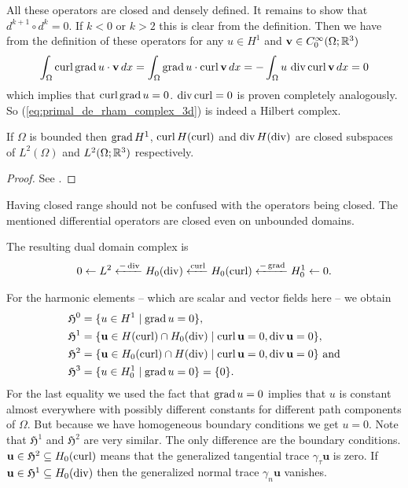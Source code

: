 \documentclass[../master_thesis.tex]{subfiles}
\begin{document}
All these operators are closed and densely defined. It remains to show that 
$d^{k+1} \circ d^k = 0$. If $k < 0$ or $k>2$ this is clear from the definition. 
Then we have from the definition of these operators 
for any $u \in H^1$ and $\mathbf{v} \in C^\infty_0(\Omega;\mathbb{R}^3)$  
\begin{align*}
    \int_\Omega \operatorname{curl} \operatorname{grad} u \cdot \mathbf{v} \, dx 
    = \int_\Omega \operatorname{grad} u \cdot \operatorname{curl} \mathbf{v} \, dx 
    = -\int_\Omega u \, \operatorname{div} \operatorname{curl} \mathbf{v} \, dx
    = 0
\end{align*}
which implies that $\operatorname{curl} \operatorname{grad} u = 0$. $\operatorname{div} \operatorname{curl} = 0$ is proven 
completely analogously. So (\ref{eq:primal_de_rham_complex_3d}) is indeed a 
Hilbert complex. 

\begin{theorem}\label{thm:closed_range}
    If $\Omega$ is bounded then $\operatorname{grad} H^1$, $\operatorname{curl} H(\operatorname{curl})$ and 
    $\operatorname{div} H(\operatorname{div})$ are closed subspaces of $L^2(\Omega)$ and 
    $L^2(\Omega;\mathbb{R}^3)$ respectively.
\end{theorem}
\begin{proof}
    See \cite[p.38]{arnold}.
\end{proof}
Having closed range should not be confused with the operators being closed.
The mentioned differential operators are closed even on unbounded domains.

The resulting dual domain complex is 
\begin{align*}
    0 \leftarrow L^2 \xleftarrow{-\operatorname{div}} H_0(\operatorname{div})
        \xleftarrow{\operatorname{curl}} H_0(\operatorname{curl}) 
        \xleftarrow{-\operatorname{grad}} H^1_0 \leftarrow 0.
\end{align*}

For the harmonic elements -- which are scalar and vector fields here -- 
we obtain
\begin{align*}
    \mathfrak{H}^0 &= \{ u \in H^1 \mid \operatorname{grad} u = 0\},
    \\ \mathfrak{H}^1 &= \{ \mathbf{u} \in H(\operatorname{curl}) \cap H_0(\operatorname{div})
        \mid \operatorname{curl} \mathbf{u} = 0, \operatorname{div} \mathbf{u} = 0\},
    \\ \mathfrak{H}^2 &= \{ \mathbf{u} \in H_0(\operatorname{curl}) \cap H(\operatorname{div})
        \mid \operatorname{curl} \mathbf{u} = 0, \operatorname{div} \mathbf{u} = 0\} \text{ and}
    \\ \mathfrak{H}^3 &= \{ u \in H^1_0
       \mid \operatorname{grad} u = 0\} = \{0\}.
\end{align*}
For the last equality we used the fact that $\operatorname{grad} u = 0$ implies that 
$u$ is constant almost everywhere with possibly different constants for 
different path components of $\Omega$. But because we have homogeneous boundary 
conditions we get $u=0$. Note that $\mathfrak{H}^1$ and $\mathfrak{H}^2$ 
are very similar. The only difference are the boundary conditions. 
$\mathbf{u} \in \mathfrak{H}^2 \subseteq H_0(\operatorname{curl})$ 
means that the generalized tangential 
trace $\gamma_\tau \mathbf{u}$ is zero. If $\mathbf{u}  \in \mathfrak{H}^1 
\subseteq H_0(\operatorname{div})$ 
then the 
generalized normal trace $\gamma_n \mathbf{u}$ vanishes.
\end{document}

